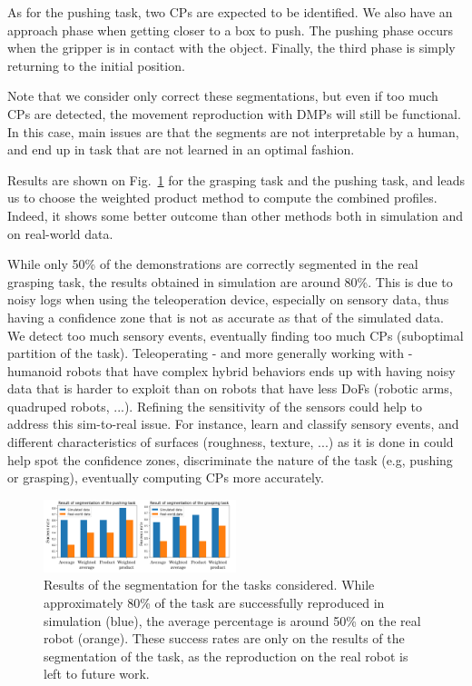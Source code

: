 \documentclass[a4paper, 10pt, conference]{ieeeconf}
\begin{document}
As for the pushing task, two CPs are expected to be identified. We also have an approach phase when getting closer to a box to push. The pushing phase occurs when the gripper is in contact with the object. Finally, the third phase is simply returning to the initial position.

Note that we consider only correct these segmentations, but even if too much CPs are detected, the movement reproduction with DMPs will still be functional. In this case, main issues are that the segments are not interpretable by a human, and end up in task that are not learned in an optimal fashion.


Results are shown on Fig.~\ref{fig:resultsSeg} for the grasping task and the pushing task, and leads us to choose the weighted product method to compute the combined profiles. Indeed, it shows some better outcome than other methods both in simulation and on real-world data. 

While only 50\% of the demonstrations are correctly segmented in the real grasping task, the results obtained in simulation are around 80\%. This is due to noisy logs when using the teleoperation device, especially on sensory data, thus having a confidence zone that is not as accurate as that of the simulated data. We detect too much sensory events, eventually finding too much CPs (suboptimal partition of the task). Teleoperating - and more generally working with - humanoid robots that have complex hybrid behaviors ends up with having noisy data that is harder to exploit than on robots that have less DoFs (robotic arms, quadruped robots, ...). Refining the sensitivity of the sensors could help to address this sim-to-real issue. For instance, learn and classify sensory events, and different characteristics of surfaces (roughness, texture, ...) as it is done in \cite{surface_digital} could help spot the confidence zones, discriminate the nature of the task (e.g, pushing or grasping), eventually computing CPs more accurately.

\begin{figure}[t]
  \centering
  \includegraphics[width=0.5\textwidth]{img/results_segmentation.pdf}
  \caption{Results of the segmentation for the tasks considered. While approximately 80\% of the task are successfully reproduced in simulation (blue), the average percentage is around 50\% on the real robot (orange). These success rates are only on the results of the segmentation of the task, as the reproduction on the real robot is left to future work.}
  \label{fig:resultsSeg}
\end{figure}
\end{document}
